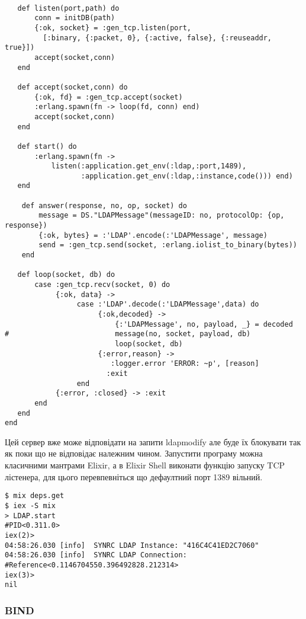 \begin{lstlisting}

   def listen(port,path) do
       conn = initDB(path)
       {:ok, socket} = :gen_tcp.listen(port,
         [:binary, {:packet, 0}, {:active, false}, {:reuseaddr, true}])
       accept(socket,conn)
   end

   def accept(socket,conn) do
       {:ok, fd} = :gen_tcp.accept(socket)
       :erlang.spawn(fn -> loop(fd, conn) end)
       accept(socket,conn)
   end

   def start() do
       :erlang.spawn(fn ->
           listen(:application.get_env(:ldap,:port,1489),
                  :application.get_env(:ldap,:instance,code())) end)
   end

    def answer(response, no, op, socket) do
        message = DS."LDAPMessage"(messageID: no, protocolOp: {op, response})
        {:ok, bytes} = :'LDAP'.encode(:'LDAPMessage', message)
        send = :gen_tcp.send(socket, :erlang.iolist_to_binary(bytes))
    end

   def loop(socket, db) do
       case :gen_tcp.recv(socket, 0) do
            {:ok, data} ->
                 case :'LDAP'.decode(:'LDAPMessage',data) do
                      {:ok,decoded} ->
                          {:'LDAPMessage', no, payload, _} = decoded
#                         message(no, socket, payload, db)
                          loop(socket, db)
                      {:error,reason} ->
                         :logger.error 'ERROR: ~p', [reason]
                        :exit
                 end
            {:error, :closed} -> :exit
       end
   end
end
\end{lstlisting}

Цей сервер вже може відповідати на запити ldapmodify але буде їх блокувати так як поки що не відповідає належним чином. Запустити програму можна класичними мантрами Elixir, а в Elixir Shell виконати функцію запуску TCP лістенера, для цього перевпевніться що дефаултний порт 1389 вільний.

\begin{lstlisting}
$ mix deps.get
$ iex -S mix
> LDAP.start
#PID<0.311.0>
iex(2)>
04:58:26.030 [info]  SYNRC LDAP Instance: "416C4C41ED2C7060"
04:58:26.030 [info]  SYNRC LDAP Connection: #Reference<0.1146704550.396492828.212314>
iex(3)>
nil
\end{lstlisting}

\newpage
\subsubsection{BIND}

